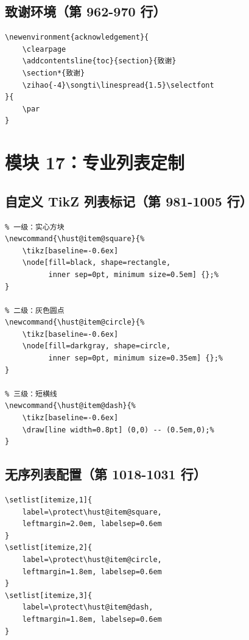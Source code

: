 \documentclass[linux]{hustreport}
\begin{document}
\subsection{致谢环境（第 962-970 行）}

\begin{verbatim}
\newenvironment{acknowledgement}{
    \clearpage
    \addcontentsline{toc}{section}{致谢}
    \section*{致谢}
    \zihao{-4}\songti\linespread{1.5}\selectfont
}{
    \par
}
\end{verbatim}

\newpage
\section{模块 17：专业列表定制}

\subsection{自定义 TikZ 列表标记（第 981-1005 行）}

\begin{verbatim}
% 一级：实心方块
\newcommand{\hust@item@square}{%
    \tikz[baseline=-0.6ex] 
    \node[fill=black, shape=rectangle, 
          inner sep=0pt, minimum size=0.5em] {};%
}

% 二级：灰色圆点
\newcommand{\hust@item@circle}{%
    \tikz[baseline=-0.6ex] 
    \node[fill=darkgray, shape=circle, 
          inner sep=0pt, minimum size=0.35em] {};%
}

% 三级：短横线
\newcommand{\hust@item@dash}{%
    \tikz[baseline=-0.6ex] 
    \draw[line width=0.8pt] (0,0) -- (0.5em,0);%
}
\end{verbatim}

\subsection{无序列表配置（第 1018-1031 行）}

\begin{verbatim}
\setlist[itemize,1]{
    label=\protect\hust@item@square,
    leftmargin=2.0em, labelsep=0.6em
}
\setlist[itemize,2]{
    label=\protect\hust@item@circle,
    leftmargin=1.8em, labelsep=0.6em
}
\setlist[itemize,3]{
    label=\protect\hust@item@dash,
    leftmargin=1.8em, labelsep=0.6em
}
\end{verbatim}
\end{document}
